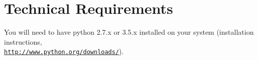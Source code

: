 \section{Technical Requirements}

You will need to have python 2.7.x or 3.5.x installed on your system (installation instructions, \\ \texttt{\url{http://www.python.org/downloads/}}).
